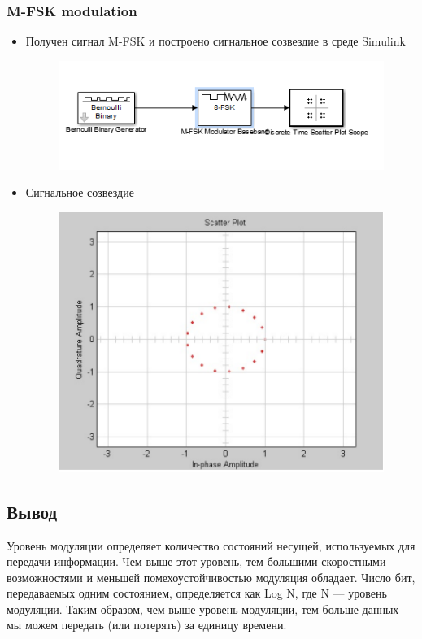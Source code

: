 \documentclass[10pt,a4paper]{article}
\begin{document}
\subsubsection{M-FSK modulation}
\begin{itemize}
\item Получен сигнал M-FSK и построено сигнальное созвездие в среде Simulink
\begin{figure}[h]
\centering
\includegraphics[width=12cm]{sim3_1.png} 
\end{figure}
\item Сигнальное созвездие
\begin{figure}[h]
\centering
\includegraphics[width=12cm]{sim3.png} 
\end{figure}
\end{itemize}
\FloatBarrier
\subsection{Вывод}
Уровень модуляции определяет количество состояний несущей, используемых для передачи информации. Чем выше этот уровень, тем большими скоростными возможностями и меньшей помехоустойчивостью модуляция обладает. Число бит, передаваемых одним состоянием, 
определяется как Log N, где N — уровень модуляции. Таким образом, чем выше уровень модуляции, тем больше данных мы можем передать (или потерять) за единицу времени. 
\end{document}
